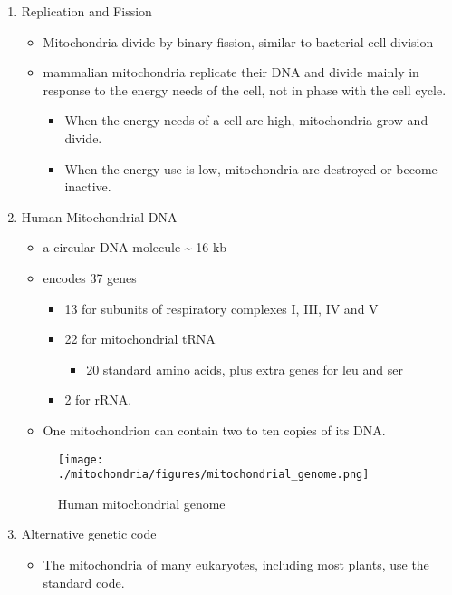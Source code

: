\documentclass{scrartcl}
\begin{document}
\begin{enumerate}
\item Replication and Fission
\label{sec:org912a02c}
\begin{itemize}
\item Mitochondria divide by binary fission, similar to bacterial cell division
\item mammalian mitochondria replicate their DNA and divide mainly in response
to the energy needs of the cell, not in phase with the cell cycle.
\begin{itemize}
\item When the energy needs of a cell are high, mitochondria grow and
divide.
\item When the energy use is low, mitochondria are destroyed
or become inactive.
\end{itemize}
\end{itemize}
\item Human Mitochondrial DNA
\label{sec:org6e28cc7}
\begin{itemize}
\item a circular DNA molecule \textasciitilde{} 16 kb
\item encodes 37 genes
\begin{itemize}
\item 13 for subunits of respiratory complexes I, III, IV and V
\item 22 for mitochondrial tRNA
\begin{itemize}
\item 20 standard amino acids, plus extra genes for leu and ser
\end{itemize}
\item 2 for rRNA.
\end{itemize}
\item One mitochondrion can contain two to ten copies of its DNA.
\end{itemize}

\begin{figure}[htbp]
\centering
\texttt{[image: ./mitochondria/figures/mitochondrial\_genome.png]}
\caption[mtdna]{\label{fig:org5e988aa}
Human mitochondrial genome}
\end{figure}

\item Alternative genetic code
\label{sec:orgf96944e}
\begin{itemize}
\item The mitochondria of many eukaryotes, including most plants, use the
standard code.
\end{itemize}


\end{enumerate}
\end{document}
